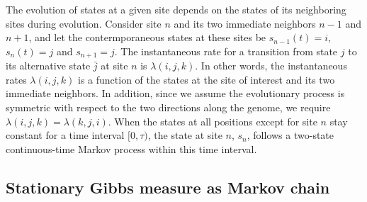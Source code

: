 \documentclass[11pt]{article}
\begin{document}
The evolution of states at a given site depends on the states of its
neighboring sites during evolution. Consider site $n$ and its two
immediate neighbors $n-1$ and $n+1$, and let the contermporaneous
states at these sites be $s_{n-1}(t) = i$, $s_n(t)=j$ and
$s_{n+1}=j$. The instantaneous rate for a transition from state $j$ to
its alternative state $\bar{j}$ at site $n$ is $\lambda(i, j, k)$. In
other words, the instantaneous rates $\lambda(i, j, k)$ is a function
of the states at the site of interest and its two immediate neighbors.
In addition, since we assume the evolutionary process is symmetric
with respect to the two directions along the genome, we require
$\lambda(i, j, k) = \lambda(k, j, i)$.
When the states at all positions except for site $n$ stay constant for
a time interval $[0,\tau)$, the state at site $n$, $s_n$, follows a
two-state continuous-time Markov process within this time interval.


\subsection{Stationary Gibbs measure as Markov chain}
\end{document}
